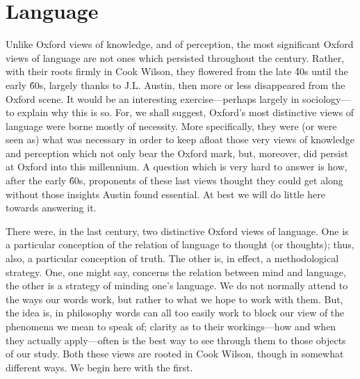 \section{Language} %
\label{sec:language}

Unlike Oxford views of knowledge, and of perception, the most significant Oxford views of language are not ones which persisted throughout the century. Rather, with their roots firmly in Cook Wilson, they flowered from the late \'40s until the early \'60s, largely thanks to J.L. Austin, then more or less disappeared from the Oxford scene. It would be an interesting exercise---perhaps largely in sociology---to explain why this is so. For, we shall suggest, Oxford's most distinctive views of language were borne mostly of necessity. More specifically, they were (or were seen as) what was necessary in order to keep afloat those very views of knowledge and perception which not only bear the Oxford mark, but, moreover, did persist at Oxford into this millennium. A question which is very hard to answer is how, after the early \'60s, proponents of these last views thought they could get along without those insights Austin found essential. At best we will do little here towards answering it.

There were, in the last century, two distinctive Oxford views of language. One is a particular conception of the relation of language to thought (or thoughts); thus, also, a particular conception of truth. The other is, in effect, a methodological strategy. One, one might say, concerns the relation between mind and language, the other is a strategy of minding one’s language. We do not normally attend to the ways our words work, but rather to what we hope to work with them. But, the idea is, in philosophy words can all too easily work to block our view of the phenomena we mean to speak of; clarity as to their workings---how and when they actually apply---often is the best way to see through them to those objects of our study. Both these views are rooted in Cook Wilson, though in somewhat different ways. We begin here with the first.

